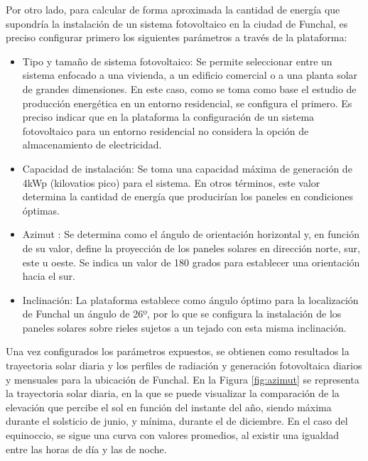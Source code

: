 \pagebreak

Por otro lado, para calcular de forma aproximada la cantidad de energía que supondría la instalación de un sistema fotovoltaico en la ciudad de Funchal, es preciso configurar primero los siguientes parámetros a través de la plataforma:

\begin{itemize}
    \item Tipo y tamaño de sistema fotovoltaico: Se permite seleccionar entre un sistema enfocado a una vivienda, a un edificio comercial o a una planta solar de grandes dimensiones. En este caso, como se toma como base el estudio de producción energética en un entorno residencial, se configura el primero. Es preciso indicar que en la plataforma la configuración de un sistema fotovoltaico para un entorno residencial no considera la opción de almacenamiento de electricidad.
    \item Capacidad de instalación: Se toma una capacidad máxima de generación de 4kWp (kilovatios pico) para el sistema. En otros términos, este valor determina la cantidad de energía que producirían los paneles en condiciones óptimas.
    \item Azimut \cite{azimut}: Se determina como el ángulo de orientación horizontal y, en función de su valor, define la proyección de los paneles solares en dirección norte, sur, este u oeste. Se indica un valor de 180 grados para establecer una orientación hacia el sur. 
    \item Inclinación: La plataforma establece como ángulo óptimo para la localización de Funchal un ángulo de 26º, por lo que se configura la instalación de los paneles solares sobre rieles sujetos a un tejado con esta misma inclinación.
\end{itemize}

Una vez configurados los parámetros expuestos, se obtienen como resultados la trayectoria solar diaria y los perfiles de radiación y generación fotovoltaica diarios y mensuales para la ubicación de Funchal. En la Figura \ref{fig:azimut} se representa la trayectoria solar diaria, en la que se puede visualizar la comparación de la elevación que percibe el sol en función del instante del año, siendo máxima durante el solsticio de junio, y mínima, durante el de diciembre. En el caso del equinoccio, se sigue una curva con valores promedios, al existir una igualdad entre las horas de día y las de noche. 

\vspace{3mm}

